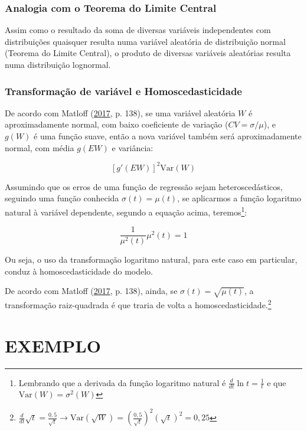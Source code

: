 \documentclass[a4paper]{article}
\let\rmarkdownfootnote\footnote%
\def\footnote{\protect\rmarkdownfootnote}
\begin{document}
\subsubsection{Analogia com o Teorema do Limite
Central}\label{analogia-com-o-teorema-do-limite-central}

Assim como o resultado da soma de diversas variáveis independentes com
distribuições quaisquer resulta numa variável aleatória de distribuição
normal (Teorema do Limite Central), o produto de diversas variáveis
aleatórias resulta numa distribuição lognormal.

\subsubsection{Transformação de variável e
Homoscedasticidade}\label{transformacao-de-variavel-e-homoscedasticidade}

De acordo com Matloff (\protect\hyperlink{ref-matloff2017}{2017}, p.
138), se uma variável aleatória \(W\) é aproximadamente normal, com
baixo coeficiente de variação (\(CV = \sigma/\mu\)), e \(g(W)\) é uma
função suave, então a nova variável também será aproximadamente normal,
com média \(g(EW)\) e variância:

\[[g'(EW)]^2\text{Var}(W)\]

Assumindo que os erros de uma função de regressão sejam
heteroscedásticos, seguindo uma função conhecida \(\sigma(t) = \mu(t)\),
se aplicarmos a função logaritmo natural à variável dependente, segundo
a equação acima, teremos\footnote{Lembrando que a derivada da função
  logaritmo natural é \(\frac{d}{dt}\ln t= \frac{1}{t}\) e que
  \(\text{Var}(W) = \sigma^2(W)\)}:

\[\frac{1}{\mu^2(t)}\mu^2(t) = 1\]

Ou seja, o uso da transformação logaritmo natural, para este caso em
particular, conduz à homoscedasticidade do modelo.

De acordo com Matloff (\protect\hyperlink{ref-matloff2017}{2017}, p.
138), ainda, se \(\sigma(t) = \sqrt{\mu(t)}\), a transformação
raiz-quadrada é que traria de volta a homoscedasticidade.\footnote{\(\frac{d}{dt}\sqrt{t} = \frac{0,5}{\sqrt{t}} \rightarrow \text{Var}(\sqrt{W}) = \left (\frac{0,5}{\sqrt{t}} \right)^2(\sqrt{t})^2 = 0,25\)}

\section{EXEMPLO}\label{exemplo}
\end{document}
